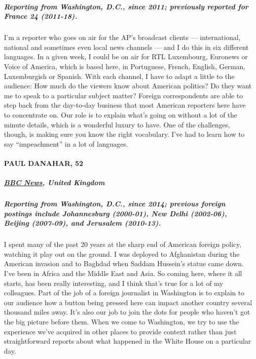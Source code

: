 \hypertarget{reporting-from-washington-dc-since-2011-previously-reported-for-france-24-2011-18}{%
\subparagraph{\texorpdfstring{\textbf{Reporting from Washington, D.C.,
since 2011; previously reported for France 24
(2011-18).}}{Reporting from Washington, D.C., since 2011; previously reported for France 24 (2011-18).}}\label{reporting-from-washington-dc-since-2011-previously-reported-for-france-24-2011-18}}

I'm a reporter who goes on air for the AP's broadcast clients ---
international, national and sometimes even local news channels --- and I
do this in six different languages. In a given week, I could be on air
for RTL Luxembourg, Euronews or Voice of America, which is based here,
in Portuguese, French, English, German, Luxemburgish or Spanish. With
each channel, I have to adapt a little to the audience: How much do the
viewers know about American politics? Do they want me to speak to a
particular subject matter? Foreign correspondents are able to step back
from the day-to-day business that most American reporters here have to
concentrate on. Our role is to explain what's going on without a lot of
the minute details, which is a wonderful luxury to have. One of the
challenges, though, is making sure you know the right vocabulary. I've
had to learn how to say ``impeachment'' in a lot of languages.

\hypertarget{paul-danahar-52}{%
\paragraph{PAUL DANAHAR, 52}\label{paul-danahar-52}}

\hypertarget{bbc-news-united-kingdom}{%
\subparagraph{\texorpdfstring{\href{https://www.bbc.com/news}{BBC News},
United
Kingdom}{BBC News, United Kingdom}}\label{bbc-news-united-kingdom}}

\hypertarget{reporting-from-washington-dc-since-2014-previous-foreign-postings-include-johannesburg-2000-01-new-delhi-2002-06-beijing-2007-09-and-jerusalem-2010-13}{%
\subparagraph{Reporting from Washington, D.C., since 2014; previous
foreign postings include Johannesburg (2000-01), New Delhi (2002-06),
Beijing (2007-09), and Jerusalem
(2010-13).}\label{reporting-from-washington-dc-since-2014-previous-foreign-postings-include-johannesburg-2000-01-new-delhi-2002-06-beijing-2007-09-and-jerusalem-2010-13}}

I spent many of the past 20 years at the sharp end of American foreign
policy, watching it play out on the ground. I was deployed to
Afghanistan during the American invasion and to Baghdad when Saddam
Hussein's statue came down. I've been in Africa and the Middle East and
Asia. So coming here, where it all starts, has been really interesting,
and I think that's true for a lot of my colleagues. Part of the job of a
foreign journalist in Washington is to explain to our audience how a
button being pressed here can impact another country several thousand
miles away. It's also our job to join the dots for people who haven't
got the big picture before them. When we come to Washington, we try to
use the experience we've acquired in other places to provide context
rather than just straightforward reports about what happened in the
White House on a particular day.

